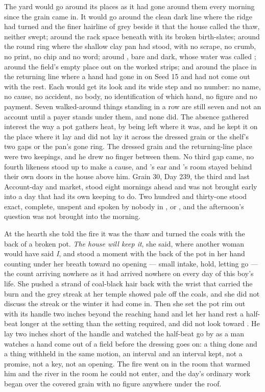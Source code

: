The yard would go around its places as it had gone around them every morning since the grain came in. It would go around the clean dark line where the  ridge had turned and the finer hairline of grey beside it that the house called the thaw, neither swept; around the rack space beneath  with its broken birth-slates; around the round ring where the shallow clay pan had stood, with no scrape, no crumb, no print, no chip and no word; around , bare and dark, whose water was called ; around the field's empty place out on the worked strips; and around the place in the returning line where a hand had gone in on Seed 15 and had not come out with the rest. Each would get its look and its wide step and no number: no name, no cause, no accident, no body, no identification of which hand, no figure and no payment. Seven walked-around things standing in a row are still seven and not an account until a payer stands under them, and none did. The absence gathered interest the way a pot gathers heat, by being left where it was, and he kept it on the place where it lay and did not lay it across the dressed grain or the shelf's two gaps or the pan's gone ring. The dressed grain and the returning-line place were two keepings, and he drew no finger between them. No third gap came, no fourth likeness stood up to make a cause, and 's ear and 's room stayed behind their own doors in the house above him. Grain 30, Day 239, the third and last Account-day and market, stood eight mornings ahead and was not brought early into a day that had its own keeping to do. Two hundred and thirty-one stood exact, complete, unspent and spoken by nobody in ,  or , and the afternoon's question was not brought into the morning.

At the hearth she told the fire it was the thaw and turned the coals with the back of a broken pot. \emph{The house will keep it}, she said, where another woman would have said \emph{I}, and stood a moment with the back of the pot in her hand counting under her breath toward no opening --- small intake, hold, letting go --- the count arriving nowhere as it had arrived nowhere on every day of this boy's life. She pushed a strand of coal-black hair back with the wrist that carried the burn and the grey streak at her temple showed pale off the coals, and she did not discuss the streak or the winter it had come in. Then she set the pot rim out with its handle two inches beyond the reaching hand and let her hand rest a half-beat longer at the setting than the setting required, and did not look toward . He lay two inches short of the handle and watched the half-beat go by as a man watches a hand come out of a field before the dressing goes on: a thing done and a thing withheld in the same motion, an interval and an interval kept, not a promise, not a key, not an opening. The fire went on in the room that warmed him and the river in the room he could not enter, and the day's ordinary work began over the covered grain with no figure anywhere under the roof.
